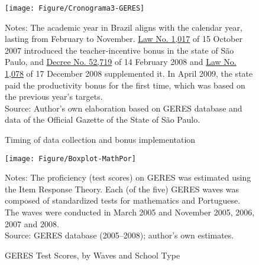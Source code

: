 \documentclass[a4paper, 12pt]{article}
\begin{document}
\newpage
\begin{figure}[H]
\centering
\captionsetup{justification=centering,margin=1cm}
   \hspace{-10pt}   \texttt{[image: Figure/Cronograma3-GERES]}
  \begin{minipage}{1\textwidth}
  \vspace{-200pt}
{\scriptsize 
Notes: The academic year in Brazil aligns with the calendar year, lasting from February to November. \href{http://tiny.cc/4opsaz}{Law No. 1,017} of 15 October 2007 introduced the teacher-incentive bonus in the state of São Paulo, and \href{http://tiny.cc/ympsaz}{Decree No. 52,719} of 14 February 2008 and \href{http://tiny.cc/0wpsaz}{Law No. 1,078} of 17 December 2008 supplemented it. In April 2009, the state paid the productivity bonus for the first time, which was based on the previous year's targets. \\
Source: Author’s own elaboration based on GERES database and data of the Official Gazette of the State of São Paulo.\par}
\end{minipage}
\vspace{-96pt}
\caption{Timing of data collection and bonus implementation}
\label{fig:Cronograma-GERES}     
    \end{figure}


\begin{figure}[H]
\centering
\captionsetup{justification=centering,margin=1.5cm}
      \texttt{[image: Figure/Boxplot-MathPor]}
       \vspace{-0.5cm}
          \begin{minipage}{1\textwidth} %
{\scriptsize
Notes: The proficiency (test scores) on GERES was estimated using the Item Response Theory. Each (of the five) GERES waves was composed of standardized tests for mathematics and Portuguese. The waves were conducted in March 2005 and November 2005, 2006, 2007 and 2008.  \\
Source: GERES database (2005–2008); author’s own estimates.\par}
\end{minipage}
\vspace{10pt}
\caption{GERES Test Scores, by Waves and School Type}
\label{fig:Boxplot-MathPor}
\end{figure} 
\end{document}

